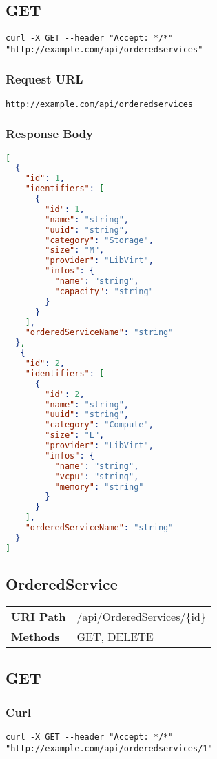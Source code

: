 \subsection{GET}
\begin{lstlisting}[style=Bash] 
curl -X GET --header "Accept: */*" "http://example.com/api/orderedservices"
\end{lstlisting}

\subsubsection{Request URL}
\begin{lstlisting}[] 
http://example.com/api/orderedservices
\end{lstlisting}

\subsubsection{Response Body}
\begin{lstlisting}[language=json] 
[
  {
    "id": 1,
    "identifiers": [
      {
        "id": 1,
        "name": "string",
        "uuid": "string",
        "category": "Storage",
        "size": "M",
        "provider": "LibVirt",
        "infos": {
          "name": "string",
          "capacity": "string"
        }
      }
    ],
    "orderedServiceName": "string"
  },
   {
    "id": 2,
    "identifiers": [
      {
        "id": 2,
        "name": "string",
        "uuid": "string",
        "category": "Compute",
        "size": "L",
        "provider": "LibVirt",
        "infos": {
          "name": "string",
          "vcpu": "string",
          "memory": "string"
        }
      }
    ],
    "orderedServiceName": "string"
  }
]
\end{lstlisting}

\subsection{OrderedService}
\begin{tabularx}{\linewidth}{l l}
\textbf{URI Path} & /api/OrderedServices/\{id\}\\
\textbf{Methods} & GET, DELETE\\
\end{tabularx}

\subsection{GET}
\subsubsection{Curl}
\begin{lstlisting}[] 
curl -X GET --header "Accept: */*" "http://example.com/api/orderedservices/1"
\end{lstlisting}


